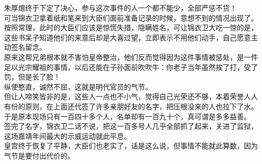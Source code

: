 \begin{multicols}{\theparacolNo}
朱厚熜终于下定了决心，参与这次事件的人一个都不能少，全部严惩不贷！\\

可当锦衣卫拿着纸和笔来到大臣们面前准备记录的时候，意想不到的情况出现了。\\

按照常理，此时的大臣们应该是惊慌失措，隐瞒姓名，可让锦衣卫大吃一惊的是，这些书呆子知道他们的来意后却是大喜过望，立即表示不用他们动手，自己愿意主动签名留念。\\

原来这帮兄弟根本就不害怕皇帝整治，他们反而觉得因为这件事情被惩处，是一件足以光宗耀祖的事情，以后还能在子孙面前吹吹牛：你老子当年虽然挨了打，受了罚，但是长了脸！\\

纵使憨直，诚然不屈，这就是明代官员的气节。\\

但让人啼笑皆非的是，这些人一点也不小气，觉得自己光荣还不够，本着荣誉人人有份的原则，在上面还代签了许多亲朋好友的名字，把压根没来的人也拉下了水。\\

于是原本现场只有一百四十多个人，名单却有一百九十个，真可谓是多多益善。\\

签完了名字，锦衣卫二话不说，把这一百多号人几乎全部抓了起来，关进了监狱，这场嘉靖年间最大的示威运动就此平息。\\

皇宫终于恢复了平静，大臣们也老实了，话是这么说，但事情不能就此算数，因为气节是要付出代价的。\\
\ifnum{}
	\end{multicols}
\fi
\newpage
